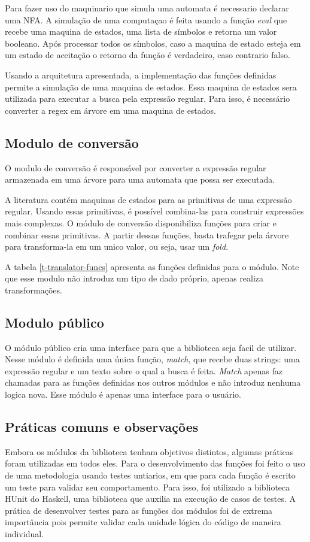 Para fazer uso do maquinario que simula uma automata é necessario declarar uma NFA.
A simulação de uma computaçao é feita usando a função \emph{eval} que recebe uma maquina de estados,  uma lista de símbolos e retorna um valor booleano.
Após processar todos os símbolos, caso a maquina de estado esteja em um estado de aceitação o retorno da função é verdadeiro, caso contrario falso.

Usando a arquitetura apresentada, a implementação das funções definidas permite a simulação de uma maquina de estados.
Essa maquina de estados sera utilizada para executar a busca pela expressão regular.
Para isso, é necessário converter a regex em árvore em uma maquina de estados.

\subsection{Modulo de conversão}

O modulo de conversão é responsável por converter a expressão regular armazenada em uma árvore para uma automata que possa ser executada.

A literatura contém maquinas de estados para as primitivas de uma expressão regular.
Usando essas primitivas, é possível combina-las para construir expressões mais complexas.
O módulo de conversão disponibiliza funções para criar e combinar essas primitivas.
A partir dessas funções, basta trafegar pela árvore para transforma-la em um unico valor, ou seja, usar um \emph{fold}.



A tabela \ref{t-translator-funcs} apresenta as funções definidas para o módulo.
Note que esse modulo não introduz um tipo de dado próprio, apenas realiza transformações.

\subsection{Modulo público}
O módulo público cria uma interface para que a biblioteca seja facil de utilizar.
Nesse módulo é definida uma única função, \emph{match}, que recebe duas strings: uma expressão regular e um texto sobre o qual a busca é feita.
\emph{Match} apenas faz chamadas para as funções definidas nos outros módulos e não introduz nenhuma logica nova.
Esse módulo é apenas uma interface para o usuário.

\subsection{Práticas comuns e observações}
Embora os módulos da biblioteca tenham objetivos distintos, algumas práticas foram utilizadas em todos eles.
Para o desenvolvimento das funções foi feito o uso de uma metodologia usando testes untiarios, em que para cada função é escrito um teste para validar seu comportamento.
Para isso, foi utilizado a biblioteca HUnit do Haskell, uma biblioteca que auxilia na execução de casos de testes.
A prática de desenvolver testes para as funções dos módulos foi de extrema importância pois permite validar cada unidade lógica do código de maneira individual.

